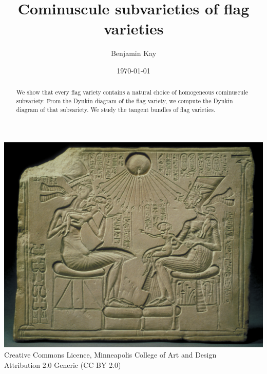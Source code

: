 \documentclass[a4paper,10pt]{amsart}
\title{Cominuscule subvarieties of flag varieties}
\author{\texorpdfstring{Benjamin \scotsMc{}Kay}{Benjamin McKay}}
\date{\today}
\theoremstyle{remark}
\begin{document}
\begin{abstract}
We show that every flag variety contains a natural choice of homogeneous cominuscule subvariety.
From the Dynkin diagram of the flag variety, we compute the Dynkin diagram of that subvariety.
We study the tangent bundles of flag varieties.
\end{abstract}
\maketitle
\begin{center}
\tiny
\includegraphics[width=\textwidth]{aten}
Creative Commons Licence, Minneapolis College of Art and Design \\
Attribution 2.0 Generic (CC BY 2.0)
\end{center}
\newpage
\begin{center}
\tableofcontents
\end{center}
\end{document}
